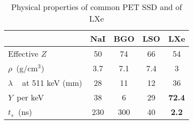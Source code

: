 \begin{table}[htdp!]
\caption{Physical properties of common PET SSD and of LXe}
\begin{center}
\begin{tabular}{l|cccc}
\toprule
& \textbf{NaI} & \textbf{BGO} & \textbf{LSO} & \textbf{LXe}\\
\hline
Effective $Z$ & 50 & 74 & 66 & 54 \\
$\rho$~(g/cm$^3$) & 3.7 & 7.1 & 7.4 &  3 \\
$\lambda$ ~ at 511 keV (mm) & 28 & 11 & 12 & 36 \\
$Y$~per keV & 38 & 6 & 29 & {\bf 72.4} \\
$t_s$~(ns) & 230 & 300 & 40 & {\bf 2.2} \\
\toprule
\end{tabular}
\end{center}
\label{table.SDPP}
\end{table}%
